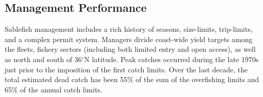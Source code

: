 \documentclass[11pt,
  english,
  a4paper,
]{article}
\begin{document}
\tagmcend\tagstructend

\clearpage


\hypertarget{management-performance}{%
\subsection*{Management Performance}\label{management-performance}}

\leavevmode\tagmcend\tagstructend


Sablefish management includes a rich history of seasons, size-limits, trip-limits, and a complex permit system. Managers divide coast-wide yield targets among the fleets, fishery sectors (including both limited entry and open access), as well as north and south of 36{\(^\circ\)\leavevmode\tagmcend\tagstructend}N latitude. Peak catches occurred during the late 1970s just prior to the imposition of the first catch limits. Over the last decade, the total estimated dead catch has been 55\% of the sum of the overfishing limits and 65\% of the annual catch limits.

\leavevmode\tagmcend\tagstructend\par

\begingroup\fontsize{10}{12}\selectfont
\begingroup\fontsize{10}{12}\selectfont
\end{document}
